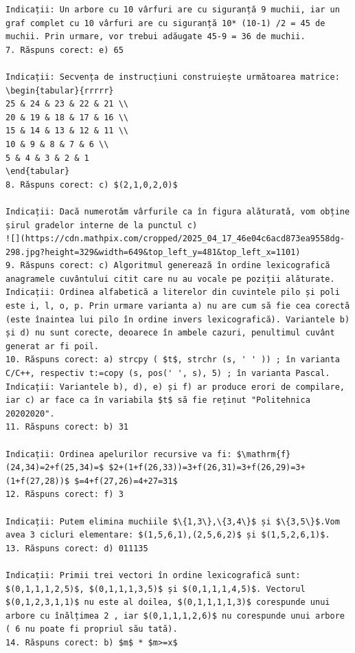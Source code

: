 \documentclass[10pt]{article}
\begin{document}
\begin{verbatim}
Indicații: Un arbore cu 10 vârfuri are cu siguranță 9 muchii, iar un graf complet cu 10 vârfuri are cu siguranță 10* (10-1) /2 = 45 de muchii. Prin urmare, vor trebui adăugate 45-9 = 36 de muchii.
7. Răspuns corect: e) 65

Indicații: Secvența de instrucțiuni construiește următoarea matrice:
\begin{tabular}{rrrrr}
25 & 24 & 23 & 22 & 21 \\
20 & 19 & 18 & 17 & 16 \\
15 & 14 & 13 & 12 & 11 \\
10 & 9 & 8 & 7 & 6 \\
5 & 4 & 3 & 2 & 1
\end{tabular}
8. Răspuns corect: c) $(2,1,0,2,0)$

Indicații: Dacă numerotăm vârfurile ca în figura alăturată, vom obține șirul gradelor interne de la punctul c)
![](https://cdn.mathpix.com/cropped/2025_04_17_46e04c6acd873ea9558dg-298.jpg?height=329&width=649&top_left_y=481&top_left_x=1101)
9. Răspuns corect: c) Algoritmul generează în ordine lexicografică anagramele cuvântului citit care nu au vocale pe poziții alăturate.
Indicații: Ordinea alfabetică a literelor din cuvintele pilo și poli este i, l, o, p. Prin urmare varianta a) nu are cum să fie cea corectă (este înaintea lui pilo în ordine invers lexicografică). Variantele b) și d) nu sunt corecte, deoarece în ambele cazuri, penultimul cuvânt generat ar fi poil.
10. Răspuns corect: a) strcpy ( $t$, strchr (s, ' ' )) ; în varianta C/C++, respectiv t:=copy (s, pos(' ', s), 5) ; în varianta Pascal.
Indicații: Variantele b), d), e) și f) ar produce erori de compilare, iar c) ar face ca în variabila $t$ să fie reținut "Politehnica 20202020".
11. Răspuns corect: b) 31

Indicații: Ordinea apelurilor recursive va fi: $\mathrm{f}(24,34)=2+f(25,34)=$ $2+(1+f(26,33))=3+f(26,31)=3+f(26,29)=3+(1+f(27,28))$ $=4+f(27,26)=4+27=31$
12. Răspuns corect: f) 3

Indicații: Putem elimina muchiile $\{1,3\},\{3,4\}$ și $\{3,5\}$.Vom avea 3 cicluri elementare: $(1,5,6,1),(2,5,6,2)$ și $(1,5,2,6,1)$.
13. Răspuns corect: d) 011135

Indicații: Primii trei vectori în ordine lexicografică sunt: $(0,1,1,1,2,5)$, $(0,1,1,1,3,5)$ și $(0,1,1,1,4,5)$. Vectorul $(0,1,2,3,1,1)$ nu este al doilea, $(0,1,1,1,1,3)$ corespunde unui arbore cu înălțimea 2 , iar $(0,1,1,1,2,6)$ nu corespunde unui arbore ( 6 nu poate fi propriul său tată).
14. Răspuns corect: b) $m$ * $m>=x$


\end{verbatim}
\end{document}
